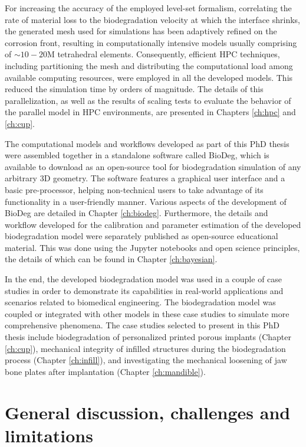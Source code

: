 For increasing the accuracy of the employed level-set formalism, correlating the rate of material loss to the biodegradation velocity at which the interface shrinks, the generated mesh used for simulations has been adaptively refined on the corrosion front, resulting in computationally intensive models usually comprising of $\sim10-20\text{M}$ tetrahedral elements. Consequently, efficient \gls{HPC} techniques, including partitioning the mesh and distributing the computational load among available computing resources, were employed in all the developed models. This reduced the simulation time by orders of magnitude. The details of this parallelization, as well as the results of scaling tests to evaluate the behavior of the parallel model in \gls{HPC} environments, are presented in Chapters \ref{ch:hpc} and \ref{ch:cup}.

The computational models and workflows developed as part of this PhD thesis were assembled together in a standalone software called BioDeg, which is available to download as an open-source tool for biodegradation simulation of any arbitrary 3D geometry. The software features a graphical user interface and a basic pre-processor, helping non-technical users to take advantage of its functionality in a user-friendly manner. Various aspects of the development of BioDeg are detailed in Chapter \ref{ch:biodeg}. Furthermore, the details and workflow developed for the calibration and parameter estimation of the developed biodegradation model were separately published as open-source educational material. This was done using the Jupyter notebooks and open science principles, the details of which can be found in Chapter \ref{ch:bayesian}.

In the end, the developed biodegradation model was used in a couple of case studies in order to demonstrate its capabilities in real-world applications and scenarios related to biomedical engineering. The biodegradation model was coupled or integrated with other models in these case studies to simulate more comprehensive phenomena. The case studies selected to present in this PhD thesis include biodegradation of personalized printed porous implants (Chapter \ref{ch:cup}), mechanical integrity of infilled structures during the biodegradation process (Chapter \ref{ch:infill}), and investigating the mechanical loosening of jaw bone plates after implantation (Chapter \ref{ch:mandible}).



\section{General discussion, challenges and limitations}

